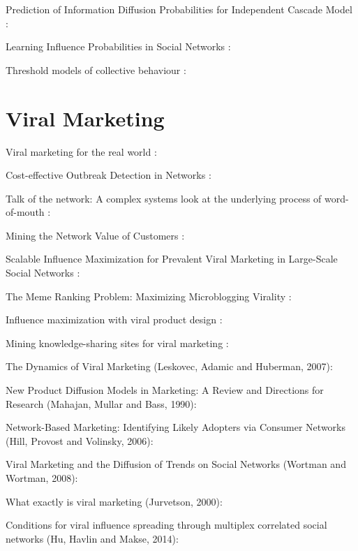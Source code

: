 Prediction of Information Diffusion Probabilities for Independent Cascade Model \cite{saito2008}:

Learning Influence Probabilities in Social Networks \cite{goyal2010}:

Threshold models of collective behaviour \cite{granovetter1978}:

\section*{Viral Marketing}

Viral marketing for the real world \cite{watts2007b}:

Cost-effective Outbreak Detection in Networks \cite{leskovec2007b}:

Talk of the network: A complex systems look at the underlying process of word-of-mouth \cite{goldenberg2001}:

Mining the Network Value of Customers \cite{domingos2001}:

Scalable Influence Maximization for Prevalent Viral Marketing in Large-Scale Social Networks \cite{chen2010b}:

The Meme Ranking Problem: Maximizing Microblogging Virality \cite{ienco2010}:

Influence maximization with viral product design \cite{barbieri2014}:

Mining knowledge-sharing sites for viral marketing \cite{richardson2002}:

The Dynamics of Viral Marketing \cite{leskovec2007} (Leskovec, Adamic and Huberman, 2007):

New Product Diffusion Models in Marketing: A Review and Directions for Research (Mahajan, Mullar and Bass, 1990):

Network-Based Marketing: Identifying Likely Adopters via Consumer Networks (Hill, Provost and Volinsky, 2006):

Viral Marketing and the Diffusion of Trends on Social Networks (Wortman and Wortman, 2008):

What exactly is viral marketing (Jurvetson, 2000):

Conditions for viral influence spreading through multiplex correlated social networks (Hu, Havlin and Makse, 2014):


